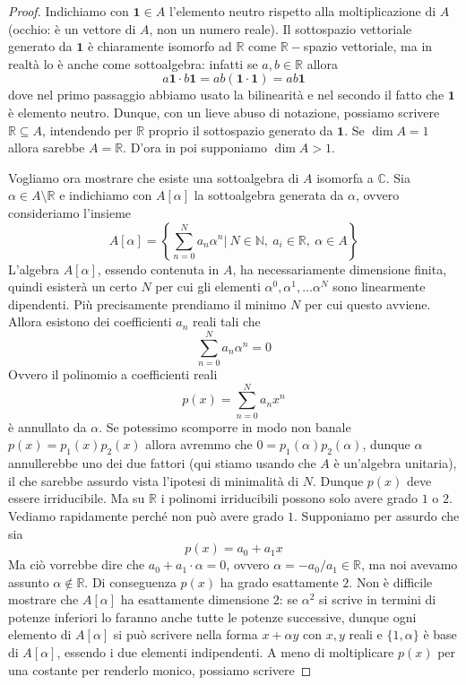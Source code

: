 \documentclass[11pt]{article}
\theoremstyle{plain}
\theoremstyle{definition}
\theoremstyle{remark}
\newcommand{\C}{\mathbb{C}}
\newcommand{\R}{\mathbb{R}}
\newcommand{\dsum}{\displaystyle\sum}
\begin{document}
\begin{proof}
Indichiamo con $\bm{1}\in A$ l'elemento neutro rispetto alla moltiplicazione di $A$ (occhio: è un vettore di $A$, non un numero reale).
Il sottospazio vettoriale generato da $\bm{1}$ è chiaramente isomorfo ad $\R$ come $\R-$spazio vettoriale, ma in
realtà lo è anche come sottoalgebra: infatti se $a,b\in\R$ allora
\[a\bm{1} \cdot b\bm{1} = ab (\bm{1}\cdot \bm{1}) = ab\bm{1} \]
dove nel primo passaggio abbiamo usato la bilinearità e nel secondo il fatto che $\bm{1}$ è elemento neutro.
Dunque, con un lieve abuso di notazione, possiamo scrivere $\R \subseteq A$, intendendo per $\R$ proprio il sottospazio generato da $\bm{1}$.
Se $\dim A = 1$ allora sarebbe $A=\R$. D'ora in poi supponiamo $\dim A > 1$.

Vogliamo ora mostrare che esiste una sottoalgebra di $A$ isomorfa a $\C$.
Sia $\alpha\in A \setminus\R$ e indichiamo con $A[\alpha]$ la sottoalgebra generata da $\alpha$, ovvero consideriamo l'insieme
\[A[\alpha] = \left\{ \dsum_{n = 0} ^N a_n \alpha^n |\ N\in\mathbb{N}, \ a_i \in \R,\ \alpha \in A   \right\} \]
L'algebra $A[\alpha]$, essendo contenuta in $A$, ha necessariamente dimensione finita, quindi esisterà un certo $N$ per cui gli elementi
$\alpha^0, \alpha^1, \dots \alpha^N$ sono linearmente dipendenti. Più precisamente prendiamo il minimo $N$ per cui questo avviene.
Allora esistono dei coefficienti $a_n$ reali tali che
\[ \dsum_{n=0}^N a_n \alpha^n = 0 \]
Ovvero il polinomio a coefficienti reali
\[ p(x) = \dsum_{n = 0}^N a_n x^n \] 
è annullato da $\alpha$.
Se potessimo scomporre in modo non banale $p(x) = p_1(x)p_2(x)$ allora avremmo che $0 = p_1(\alpha)p_2(\alpha)$, dunque $\alpha$ annullerebbe uno dei due fattori (qui
stiamo usando che $A$ è un'algebra unitaria), il che sarebbe assurdo vista l'ipotesi di minimalità di $N$.
Dunque $p(x)$ deve essere irriducibile. Ma su $\R$ i polinomi irriducibili possono solo avere grado $1$ o $2$.
Vediamo rapidamente perché non può avere grado $1$.
Supponiamo per assurdo che sia
\[p(x) = a_0 + a_1 x\]
Ma ciò vorrebbe dire che $a_0+a_1\cdot\alpha=0$, ovvero $\alpha=-a_0/a_1 \in \R$, ma noi avevamo assunto $\alpha\not\in\R$.
Di conseguenza $p(x)$ ha grado esattamente $2$.
Non è difficile mostrare che $A[\alpha]$ ha esattamente dimensione $2$: se $\alpha^2$ si scrive in termini di potenze inferiori lo faranno anche tutte le potenze successive,
dunque ogni elemento di $A[\alpha]$ si può scrivere nella forma $x + \alpha y$ con $x,y$ reali e $\{1,\alpha\}$ è base di $A[\alpha]$, essendo i due elementi indipendenti.
A meno di moltiplicare $p(x)$ per una costante per renderlo monico, possiamo scrivere 

\end{proof}
\end{document}
